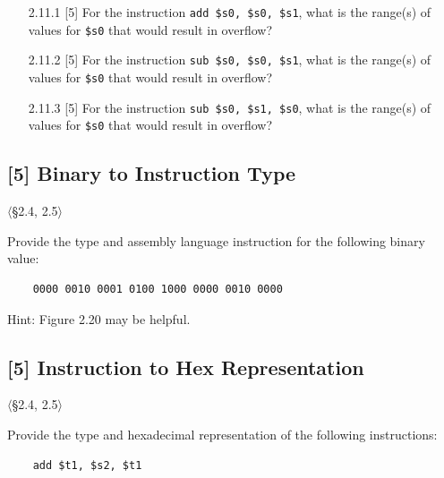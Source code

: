 \begin{enumerate}
  \item[2.11.1] [5] For the instruction \texttt{add \$s0, \$s0, \$s1}, what is
        the range(s) of values for \texttt{\$s0} that would result in
        overflow?
  \item[2.11.2] [5] For the instruction \texttt{sub \$s0, \$s0, \$s1}, what is
        the range(s) of values for \texttt{\$s0} that would result in
        overflow?
  \item[2.11.3] [5] For the instruction \texttt{sub \$s0, \$s1, \$s0}, what is
        the range(s) of values for \texttt{\$s0} that would result in
        overflow?
\end{enumerate}

\problembreak

\subsection{[5] Binary to Instruction Type}
\hypertarget{prob-2.12}{}
\noindent$\langle$\S2.4, 2.5$\rangle$\medskip

\noindent Provide the type and assembly language instruction for the following
binary value:
\begin{verbatim}
    0000 0010 0001 0100 1000 0000 0010 0000
\end{verbatim}
Hint: Figure 2.20 may be helpful.

\problembreak

\subsection{[5] Instruction to Hex Representation}
\hypertarget{prob-2.13}{}
\noindent$\langle$\S2.4, 2.5$\rangle$\medskip

\noindent Provide the type and hexadecimal representation of the following
instructions:
\begin{verbatim}
    add $t1, $s2, $t1
\end{verbatim}

\problembreak

